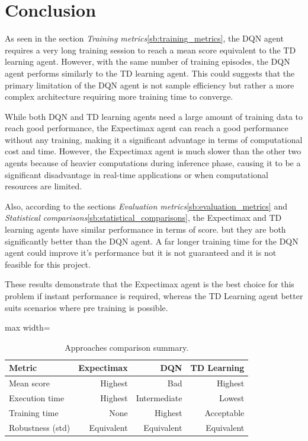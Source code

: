 \documentclass[letterpaper]{article} %
\begin{document}
\section{Conclusion}
    As seen in the section \textit{Training metrics}\ref{sb:training_metrics}, the DQN agent requires a very long training session to reach a mean score equivalent to the TD learning agent. 
    However, with the same number of training episodes, the DQN agent performs similarly to the TD learning agent. 
    This could suggests that the primary limitation of the DQN agent is not sample efficiency but rather a more complex architecture requiring more training time to 
    converge.

    While both DQN and TD learning agents need a large amount of training data to reach good performance, 
    the Expectimax agent can reach a good performance without any training, making it a significant advantage in terms of computational cost and time.
    However, the Expectimax agent is much slower than the other two agents because of heavier computations during inference phase, causing it to be 
    a significant disadvantage in real-time applications or when computational resources are limited.

    Also, according to the sections \textit{Evaluation metrics}\ref{sb:evaluation_metrics} and \textit{Statistical comparisons}\ref{sb:statistical_comparisons}, the Expectimax and TD learning agents have similar performance in terms of score.
    but they are both significantly better than the DQN agent. A far longer training time for the DQN agent could improve it's performance but it is not guaranteed and it is not feasible for this project.

    These results demonstrate that the Expectimax agent is the best choice for this problem if instant performance is required, whereas the TD Learning agent better 
    suits scenarios where pre training is possible.  


    \begin{table}[H]
        \centering
        \small
        \begin{adjustbox}{max width=\columnwidth}
        \begin{tabular}{l r r r}
        \toprule
        \textbf{Metric} & \textbf{Expectimax} & \textbf{DQN} & \textbf{TD Learning} \\
        \midrule
        Mean score       & Highest    & Bad          & Highest    \\
        Execution time   & Highest    & Intermediate & Lowest     \\
        Training time    & None       & Highest      & Acceptable \\
        Robustness (std) & Equivalent & Equivalent   & Equivalent \\
        \bottomrule
        \end{tabular}
        \end{adjustbox}
        \caption{Approaches comparison summary.}
        \label{tab:comparison_summary}
    \end{table}
\end{document}
